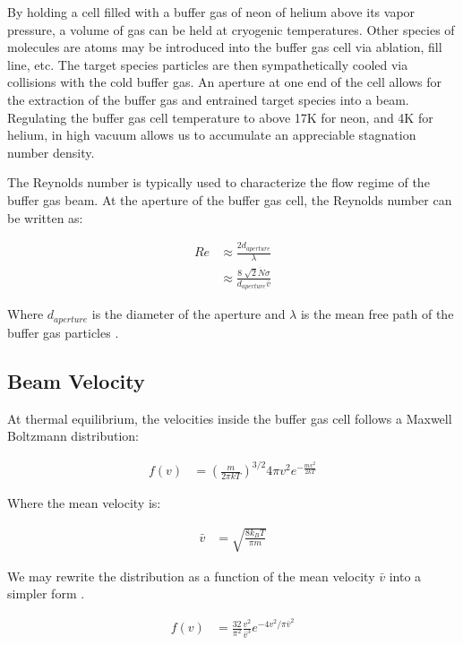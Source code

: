 By holding a cell filled with a buffer gas of neon of helium above its vapor pressure, a volume of gas can be held at cryogenic temperatures. Other species of molecules are atoms may be introduced into the buffer gas cell via ablation, fill line, etc. The target species particles are then sympathetically cooled via collisions with the cold buffer gas. An aperture at one end of the cell allows for the extraction of the buffer gas and entrained target species into a beam. Regulating the buffer gas cell temperature to above 17K for neon, and 4K for helium, in high vacuum allows us to accumulate an appreciable stagnation number density.

The Reynolds number is typically used to characterize the flow regime of the buffer gas beam. At the aperture of the buffer gas cell, the Reynolds number can be written as:

\begin{align} \label{e: reynolds}
Re & \approx \frac{2 d_{aperture}}{\lambda} \\
& \approx \frac{8\sqrt[]{2} \dot{N} \sigma}{d_{aperture} \bar{v}}
\end{align}

Where $d_{aperture}$ is the diameter of the aperture and $\lambda$ is the mean free path of the buffer gas particles \cite{Hutzler2012}.

\subsection{Beam Velocity}

At thermal equilibrium, the velocities inside the buffer gas cell follows a Maxwell Boltzmann distribution:

\begin{align} \label{e: mb_distribution}
f(v) & = \left(\frac{m}{2 \pi k T}\right)^{3/2}4 \pi v^2 e^{-\frac{m v^2}{2 k T}}
\end{align}

Where the mean velocity is:

\begin{align} \label{e: mb_mean}
\bar{v} & = \sqrt{\frac{8 k_B T}{\pi m}}
\end{align}

We may rewrite the distribution as a function of the mean velocity $\bar{v}$ into a simpler form .

\begin{align} \label{e: mb_simplified}
f(v) & = \frac{32}{\pi^2} \frac{v^2}{\bar{v}^3} e^{-4v^2/\pi \bar{v}^2}
\end{align}

